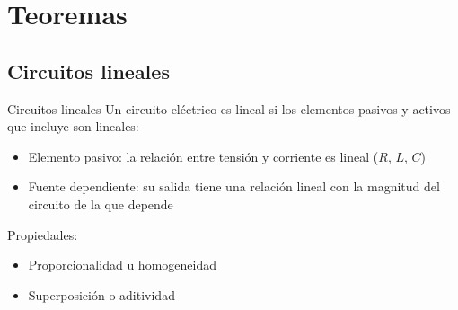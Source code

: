 \documentclass[aspectratio=169, xcolor={usenames,svgnames,dvipsnames}]{beamer}
\begin{document}



\section{Teoremas}

\subsection{Circuitos lineales} 

\begin{frame}{Circuitos lineales}
    Un circuito eléctrico es \alert{lineal} si los elementos pasivos y activos que incluye son lineales:
	\begin{itemize}
	    \item \alert{Elemento pasivo}: la relación entre tensión y corriente es lineal ($R$, $L$, $C$)
        \item \alert{Fuente dependiente}: su salida tiene una relación lineal con la magnitud del circuito de la que depende
	\end{itemize}
    \vspace{5mm}
    Propiedades:
    \begin{itemize}
        \item \alert{Proporcionalidad} u homogeneidad
        \item \alert{Superposición} o aditividad
    \end{itemize}    
\end{frame}
\end{document}
